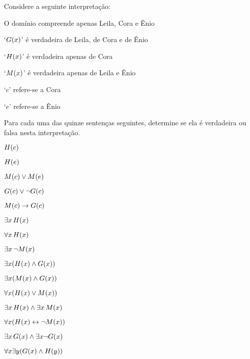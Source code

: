 \problempart
\label{pr.TorF2}
Considere a seguinte interpretação:	
	\begin{ebullet}
		\item O domínio compreende apenas Leila, Cora e Ênio
		\item `$\mathord{G}(x)$' é verdadeira de Leila, de Cora e de Ênio
		\item `$\mathord{H}(x)$' é verdadeira apenas de Cora
		\item `$\mathord{M}(x)$' é verdadeira apenas de Leila e Ênio
		\item `$c$' refere-se a Cora
		\item `$e$' refere-se a Ênio
	\end{ebullet}
Para cada uma das quinze sentenças seguintes, determine se ela é verdadeira ou falsa nesta interpretação.
\begin{earg}
\item $\mathord{H}(c) $
\item $\mathord{H}(e) $
\item $\mathord{M}(c)  \vee \mathord{M}(e)$
\item $\mathord{G}(c)  \vee \neg \mathord{G}(c)$
\item $\mathord{M}(c)  \rightarrow \mathord{G}(c)$
\item $\exists x\, \mathord{H}(x)$
\item $\forall x\, \mathord{H}(x)$
\item $\exists x\, \neg \mathord{M}(x)$
\item $\exists x(\mathord{H}(x) \wedge \mathord{G}(x))$
\item $\exists x(\mathord{M}(x) \wedge \mathord{G}(x))$
\item $\forall x(\mathord{H}(x) \vee \mathord{M}(x))$
\item $\exists x\, \mathord{H}(x) \wedge \exists x\, \mathord{M}(x)$
\item $\forall x(\mathord{H}(x) \leftrightarrow \neg \mathord{M}(x))$
\item $\exists x\, \mathord{G}(x) \wedge \exists x \neg \mathord{G}(x)$
\item $\forall x\exists y(\mathord{G}(x) \wedge \mathord{H}(y))$
\end{earg}

